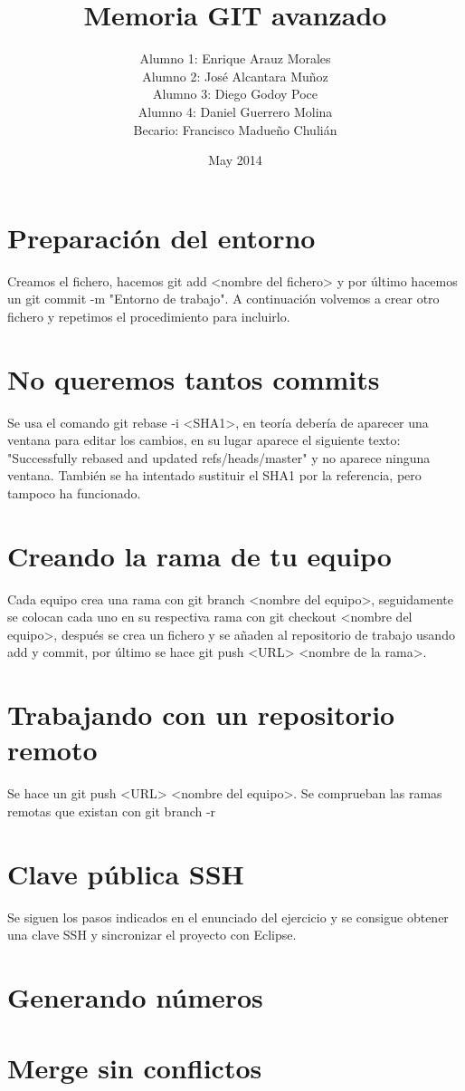 \documentclass{article}
\title{Memoria GIT avanzado}
\author{Alumno 1: Enrique Arauz Morales\\
        Alumno 2: José Alcantara Muñoz\\
        Alumno 3: Diego Godoy Poce\\
        Alumno 4: Daniel Guerrero Molina\\
        Becario: Francisco Madueño Chulián}
\date{May 2014}
\begin{document}
\maketitle

\section{Preparación del entorno}
Creamos el fichero, hacemos git add <nombre del fichero> y por último hacemos un git commit -m "Entorno de trabajo". A continuación volvemos a crear otro fichero y repetimos el procedimiento para incluirlo.
\section{No queremos tantos commits}
Se usa el comando git rebase -i <SHA1>, en teoría debería de aparecer una ventana para editar los cambios, en su lugar aparece el siguiente texto: "Successfully rebased and updated refs/heads/master" y no aparece ninguna ventana. También se ha intentado sustituir el SHA1 por la referencia, pero tampoco ha funcionado.
\section{Creando la rama de tu equipo}
Cada equipo crea una rama con git branch <nombre del equipo>, seguidamente se colocan cada uno en su respectiva rama con git checkout <nombre del equipo>, después se crea un fichero y se añaden al repositorio de trabajo usando add y commit, por último se hace git push <URL> <nombre de la rama>.
\section{Trabajando con un repositorio remoto}
Se hace un git push <URL> <nombre del equipo>. Se comprueban las ramas remotas que existan con git branch -r
\section{Clave pública SSH}
Se siguen los pasos indicados en el enunciado del ejercicio y se consigue obtener una clave SSH y sincronizar el proyecto con Eclipse.
\section{Generando números}
\section{Merge sin conflictos}
\end{document}
